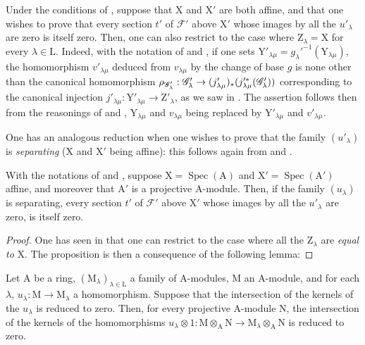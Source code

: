 \begin{env}[11.9.6]
\label{IV.11.9.6}
Under the conditions of , suppose that $\mathrm{X}$ and $\mathrm{X}'$ are both affine, and that one wishes to prove that every section $t'$ of $\mathscr{F}'$ above $\mathrm{X}'$ whose images by all the $u'_\lambda$ are zero is itself zero.
Then, one can also restrict to the case where $\mathrm{Z}_\lambda=\mathrm{X}$ for every $\lambda\in\mathrm{L}$.
Indeed, with the notation of  and , if one sets $\mathrm{Y}'_{\lambda\mu}=g_\lambda'^{-1}(\mathrm{Y}_{\lambda\mu})$, the homomorphism $v'_{\lambda\mu}$ deduced from $v_{\lambda\mu}$ by the change of base $g$ is none other than the canonical homomorphism
$\rho_{\mathscr{G}'_\lambda}:\mathscr{G}'_\lambda\to(j'_{\lambda\mu})_*(j_{\lambda\mu}'^*(\mathscr{G}'_\lambda))$ corresponding to the canonical injection $j'_{\lambda\mu}:\mathrm{Y}'_{\lambda\mu}\to\mathrm{Z}'_\lambda$, as we saw in .
The assertion follows then from the reasonings of  and , $\mathrm{Y}_{\lambda\mu}$ and $v_{\lambda\mu}$ being replaced by $\mathrm{Y}'_{\lambda\mu}$ and $v'_{\lambda\mu}$.

One has an analogous reduction when one wishes to prove that the family $(u'_\lambda)$ is \emph{separating} ($\mathrm{X}$ and $\mathrm{X}'$ being affine): this follows again from  and .
\end{env}

\begin{proposition}[11.9.7]
\label{IV.11.9.7}
With the notations of  and , suppose $\mathrm{X}=\operatorname{Spec}(\mathrm{A})$ and $\mathrm{X}'=\operatorname{Spec}(\mathrm{A}')$ affine, and moreover that $\mathrm{A}'$ is a projective $\mathrm{A}$-module.
Then, if the family $(u_\lambda)$ is separating, every section $t'$ of $\mathscr{F}'$ above $\mathrm{X}'$ whose images by all the $u'_\lambda$ are zero, is itself zero.
\end{proposition}

\begin{proof}
One has seen in  that one can restrict to the case where all the $\mathrm{Z}_\lambda$ are \emph{equal to} $\mathrm{X}$.
The proposition is then a consequence of the following lemma:
\end{proof}

\begin{lemma}[11.9.7.1]
\label{IV.11.9.7.1}
Let $\mathrm{A}$ be a ring, $(\mathrm{M}_\lambda)_{\lambda\in\mathrm{L}}$ a family of $\mathrm{A}$-modules, $\mathrm{M}$ an $\mathrm{A}$-module, and for each $\lambda$, $u_\lambda:\mathrm{M}\to\mathrm{M}_\lambda$ a homomorphism.
Suppose that the intersection of the kernels of the $u_\lambda$ is reduced to zero.
Then, for every projective $\mathrm{A}$-module $\mathrm{N}$, the intersection of the kernels of the homomorphisms $u_\lambda\otimes 1:\mathrm{M}\otimes_\mathrm{A}\mathrm{N}\to\mathrm{M}_\lambda\otimes_\mathrm{A}\mathrm{N}$ is reduced to zero.
\end{lemma}

